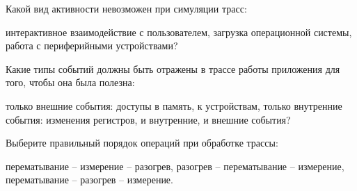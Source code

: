 \begin{questions}

\question[3] Какой вид активности невозможен при симуляции трасс:
\begin{choices}
\correctchoice интерактивное взаимодействие с пользователем,
\choice загрузка операционной системы,
\choice работа с периферийными устройствами?
\end{choices}

\question[3] Какие типы событий должны быть отражены в трассе работы приложения для того, чтобы она была полезна:
\begin{choices}
\correctchoice только внешние события: доступы в память, к устройствам,
\choice только внутренние события: изменения регистров,
\choice и внутренние, и внешние события?
\end{choices}

\question[3] Выберите правильный порядок операций при обработке трассы:
\begin{choices}
\choice перематывание -- измерение -- разогрев,
\choice разогрев -- перематывание  -- измерение,
\correctchoice перематывание -- разогрев -- измерение.
\end{choices}

\end{questions}


